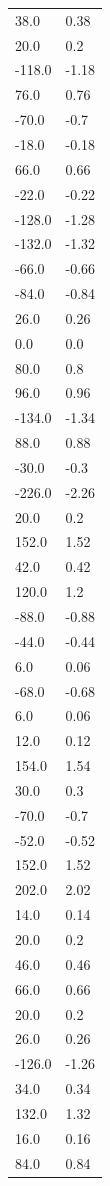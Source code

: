 \begin{longtable}{ll}
38.0 & 0.38 \\
20.0 & 0.2 \\
-118.0 & -1.18 \\
76.0 & 0.76 \\
-70.0 & -0.7 \\
-18.0 & -0.18 \\
66.0 & 0.66 \\
-22.0 & -0.22 \\
-128.0 & -1.28 \\
-132.0 & -1.32 \\
-66.0 & -0.66 \\
-84.0 & -0.84 \\
26.0 & 0.26 \\
0.0 & 0.0 \\
80.0 & 0.8 \\
96.0 & 0.96 \\
-134.0 & -1.34 \\
88.0 & 0.88 \\
-30.0 & -0.3 \\
-226.0 & -2.26 \\
20.0 & 0.2 \\
152.0 & 1.52 \\
42.0 & 0.42 \\
120.0 & 1.2 \\
-88.0 & -0.88 \\
-44.0 & -0.44 \\
6.0 & 0.06 \\
-68.0 & -0.68 \\
6.0 & 0.06 \\
12.0 & 0.12 \\
154.0 & 1.54 \\
30.0 & 0.3 \\
-70.0 & -0.7 \\
-52.0 & -0.52 \\
152.0 & 1.52 \\
202.0 & 2.02 \\
14.0 & 0.14 \\
20.0 & 0.2 \\
46.0 & 0.46 \\
66.0 & 0.66 \\
20.0 & 0.2 \\
26.0 & 0.26 \\
-126.0 & -1.26 \\
34.0 & 0.34 \\
132.0 & 1.32 \\
16.0 & 0.16 \\
84.0 & 0.84 \\

\end{longtable}
